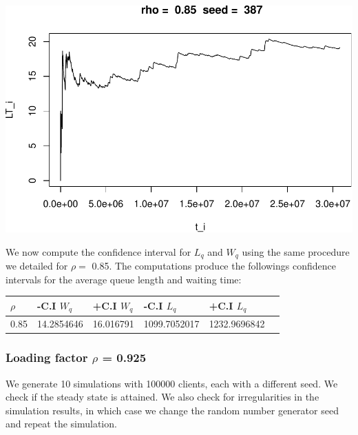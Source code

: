\documentclass[]{article}
\begin{document}
\includegraphics{003_files/figure-latex/unnamed-chunk-20-10.pdf}

We now compute the confidence interval for \(L_{q}\) and \(W_{q}\) using
the same procedure we detailed for \(\rho =\) 0.85. The computations
produce the followings confidence intervals for the average queue length
and waiting time:

\begin{longtable}[]{@{}llllll@{}}
\toprule
\(\rho\) & -C.I \(W_{q}\) & +C.I \(W_{q}\) & -C.I \(L_{q}\) & +C.I
\(L_{q}\) &\tabularnewline
\midrule
\endhead
0.85 & 14.2854646 & 16.016791 & 1099.7052017 &
1232.9696842\tabularnewline
\bottomrule
\end{longtable}

\subsubsection{\texorpdfstring{Loading factor \(\rho\) =
0.925}{Loading factor \textbackslash{}rho = 0.925}}\label{loading-factor-rho-0.925}

We generate 10 simulations with 100000 clients, each with a different
seed. We check if the steady state is attained. We also check for
irregularities in the simulation results, in which case we change the
random number generator seed and repeat the simulation.
\end{document}
